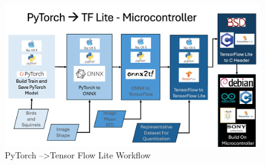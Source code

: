 \documentclass[conference]{IEEEtran}
\begin{document}
\begin{figure}[htbp]
\centerline{\includegraphics[scale=0.3]{pyTorch2TFLite.png}}
\caption{PyTorch --\textgreater Tensor Flow Lite Workflow}
\label{torch2tf}
\end{figure}
\end{document}
